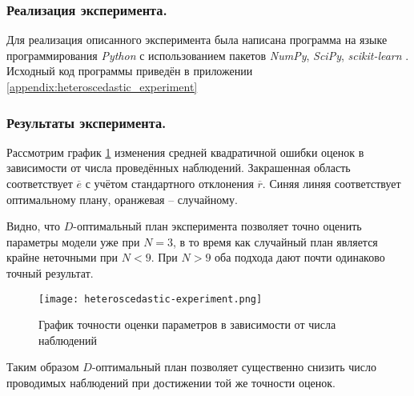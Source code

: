 \subsubsection{Реализация эксперимента.}
Для реализация описанного эксперимента была написана программа на языке программирования \textit{Python} с использованием пакетов \textit{NumPy}, \textit{SciPy}, \textit{scikit-learn} \cite{scikit-learn}. Исходный код программы приведён в приложении \ref{appendix:heteroscedastic_experiment}

\subsubsection{Результаты эксперимента.}
Рассмотрим график \ref{fig:heteroscedastic-experiment} изменения средней квадратичной ошибки оценок в зависимости от числа проведённых наблюдений. Закрашенная область соответствует $\overline e$ с учётом стандартного отклонения $\overline r$. Синяя линяя соответствует оптимальному плану, оранжевая -- случайному.

Видно, что $D$-оптимальный план эксперимента позволяет точно оценить параметры модели уже при $N=3$, в то время как случайный план является крайне неточными при $N < 9$. При $N > 9$ оба подхода дают почти одинаково точный результат.

\begin{figure}[h]
	\centering
	\texttt{[image: heteroscedastic-experiment.png]}
	\caption {График точности оценки параметров в зависимости от числа наблюдений}
	\label{fig:heteroscedastic-experiment}
\end{figure}

Таким образом $D$-оптимальный план позволяет существенно снизить число проводимых наблюдений при достижении той же точности оценок.


